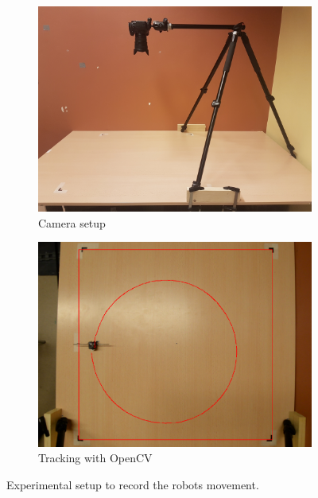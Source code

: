 \begin{figure}
	\centering
	\begin{subfigure}[b]{0.45\textwidth}
		\includegraphics[width=\textwidth]{pics/movement_setup.jpg}
		\caption{Camera setup}
		\label{fig:movement_setup}
	\end{subfigure}
	\quad
	\begin{subfigure}[b]{0.45\textwidth}
		\includegraphics[width=\textwidth]{pics/movement_example.png}
		\caption{Tracking with OpenCV}
		\label{fig:movement_example}
	\end{subfigure}
	\caption{Experimental setup to record the robots movement.}
\end{figure}

